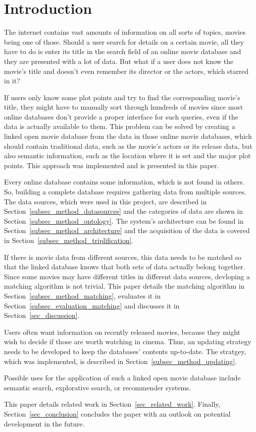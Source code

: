 \section{Introduction}
\label{sec_introduction}

The internet contains vast amounts of information on all sorts of topics, movies being one of those.
Should a user search for details on a certain movie, all they have to do is enter its title in the search field of an online movie database and they are presented with a lot of data.
But what if a user does not know the movie's title and doesn't even remember its director or the actors, which starred in it?

If users only know some plot points and try to find the corresponding movie's title, they might have to manually sort through hundreds of movies since most online databases don't provide a proper interface for such queries, even if the data is actually available to them.
This problem can be solved by creating a linked open movie database from the data in those online movie databases, which should contain traditional data, such as the movie's actors or its release data, but also semantic information, such as the location where it is set and the major plot points.
This approach was implemented and is presented in this paper.

Every online database contains some information, which is not found in others.
So, building a complete database requires gathering data from multiple sources.
The data sources, which were used in this project, are described in Section~\ref{subsec_method_datasources} and the categories of data are shown in Section~\ref{subsec_method_ontology}.
The system's architecture can be found in Section~\ref{subsec_method_architecture} and the acquisition of the data is covered in Section~\ref{subsec_method_triplification}.

If there is movie data from different sources, this data needs to be matched so that the linked database knows that both sets of data actually belong together.
Since some movies may have different titles in different data sources, devloping a matching algorithm is not trivial.
This paper details the matching algorithm in Section~\ref{subsec_method_matching}, evaluates it in Section~\ref{subsec_evaluation_matching} and discusses it in Section~\ref{sec_discussion}.

Users often want information on recently released movies, because they might wish to decide if those are worth watching in cinema.
Thus, an updating strategy needs to be developed to keep the databases' contents up-to-date.
The stratgey, which was implemented, is described in Section~\ref{subsec_method_updating}.

Possible uses for the application of such a linked open movie database include semantic search, explorative search, or recommender systems.

This paper details related work in Section~\ref{sec_related_work}.
Finally, Section~\ref{sec_conclusion} concludes the paper with an outlook on potential development in the future.
